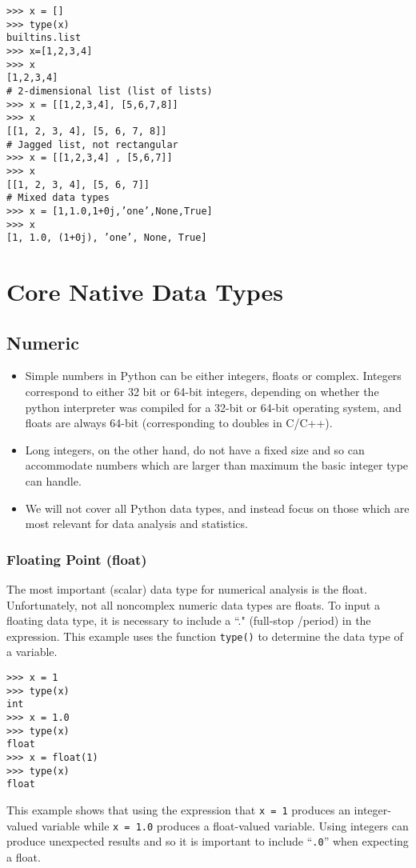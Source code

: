 \documentclass[KSmain.tex]{subfiles}
\begin{document}
\begin{framed}
\begin{verbatim}
>>> x = []
>>> type(x)
builtins.list
>>> x=[1,2,3,4]
>>> x
[1,2,3,4]
# 2-dimensional list (list of lists)
>>> x = [[1,2,3,4], [5,6,7,8]]
>>> x
[[1, 2, 3, 4], [5, 6, 7, 8]]
# Jagged list, not rectangular
>>> x = [[1,2,3,4] , [5,6,7]]
>>> x
[[1, 2, 3, 4], [5, 6, 7]]
# Mixed data types
>>> x = [1,1.0,1+0j,’one’,None,True]
>>> x
[1, 1.0, (1+0j), ’one’, None, True]

\end{verbatim}
\end{framed}

\newpage

\section{Core Native Data Types}
\subsection{ Numeric}
\begin{itemize}
\item Simple numbers in Python can be either integers, floats or complex. Integers correspond to either 32
bit or 64-bit integers, depending on whether the python interpreter was compiled for a 32-bit or 64-bit
operating system, and floats are always 64-bit (corresponding to doubles in C/C++). 

\item Long integers, on the
other hand, do not have a fixed size and so can accommodate numbers which are larger than maximum
the basic integer type can handle. 

\item We will not cover all Python data types, and instead focus
on those which are most relevant for data analysis and statistics. 
\end{itemize}
\subsubsection{Floating Point (float)}
The most important (scalar) data type for numerical analysis is the float. Unfortunately, not all noncomplex
numeric data types are floats. To input a floating data type, it is necessary to include a ``." (full-stop /period) in the expression. This example uses the function \texttt{type()} to determine the data type of a variable.
\begin{framed}
\begin{verbatim}
>>> x = 1
>>> type(x)
int
>>> x = 1.0
>>> type(x)
float
>>> x = float(1)
>>> type(x)
float
\end{verbatim}
\end{framed}
This example shows that using the expression that \texttt{x = 1} produces an integer-valued variable while \texttt{x = 1.0}
produces a float-valued variable. Using integers can produce unexpected results and so it is important to
include ``\texttt{.0}” when expecting a float.
\newpage
\end{document}

